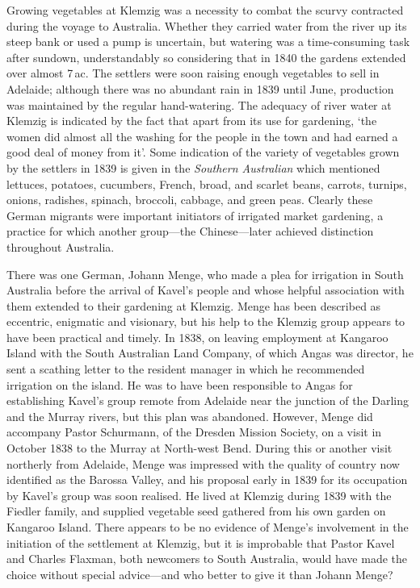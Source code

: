 Growing vegetables at Klemzig was a necessity to combat the scurvy
contracted during the voyage to Australia.  Whether they carried water
from the river up its steep bank or used a pump is uncertain, but
watering was a time-consuming task after sundown, understandably so
considering that in 1840 the gardens extended over almost 7\,ac. The
settlers were soon raising enough vegetables to sell in Adelaide;
although there was no abundant rain in 1839 until June, production was
maintained by the regular hand-watering.  The adequacy of river water
at Klemzig is indicated by the fact that apart from its use for
gardening, `the women did almost all the washing for the people in the
town and had earned a good deal of money from it'.  Some indication of
the variety of vegetables grown by the settlers in 1839 is given in
the \textsl{Southern Australian} which mentioned lettuces, potatoes,
cucumbers, French, broad, and scarlet beans, carrots, turnips, onions,
radishes, spinach, broccoli, cabbage, and green peas. Clearly these
German migrants were important initiators of irrigated market
gardening, a practice for which another group---the Chinese---later
achieved distinction throughout Australia.

There was one German, Johann Menge, who made a plea for irrigation in
South Australia before the arrival of Kavel's people and whose helpful
association with them extended to their gardening at Klemzig.  Menge
has been described as eccentric, enigmatic and visionary, but his help
to the Klemzig group appears to have been practical and timely.  In
1838, on leaving employment at Kangaroo Island with the South
Australian Land Company, of which Angas was director, he sent a
scathing letter to the resident manager in which he recommended
irrigation on the island.  He was to have been responsible to Angas
for establishing Kavel's group remote from Adelaide near the junction
of the Darling and the Murray rivers, but this plan was abandoned.
However, Menge did accompany Pastor Schurmann, of the Dresden Mission
Society, on a visit in October 1838 to the Murray at North-west Bend.
During this or another visit northerly from Adelaide, Menge was
impressed with the quality of country now identified as the Barossa
Valley, and his proposal early in 1839 for its occupation by Kavel's
group was soon realised.  He lived at Klemzig during 1839 with the
Fiedler family, and supplied vegetable seed gathered from his own
garden on Kangaroo Island.  There appears to be no evidence of Menge's
involvement in the initiation of the settlement at Klemzig, but it is
improbable that Pastor Kavel and Charles Flaxman, both newcomers to
South Australia, would have made the choice without special
advice---and who better to give it than Johann Menge?

